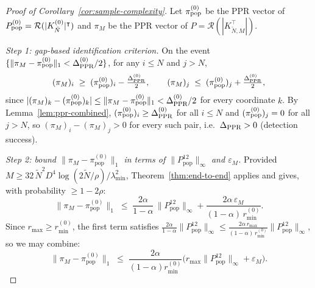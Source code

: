\documentclass{article}
\theoremstyle{plain}
\theoremstyle{definition}
\newcommand{\norm}[1]{\| #1 \|}
\def\tp{\intercal}
\begin{document}
\begin{proof}[Proof of Corollary~\ref{cor:sample-complexity}]
	Let $\pi_{\textnormal{pop}}^{(0)}$ be the PPR vector of $P^{(0)}_{\textnormal{pop}} = \mathcal{R}(|K^{(0)}_{\tilde{N}}|^\tp)$ and ${\pi}_M$ be the PPR vector of $P = \mathcal{R}(|K_{\tilde{N},M}^\tp|)$. 
	
	\emph{Step 1: gap-based identification criterion.} On the event $\{\norm{{\pi}_M - \pi_{\textnormal{pop}}^{(0)}}_1 < \Delta^{(0)}_{\textnormal{PPR}}/2\}$, for any $i \leq N$ and $j > N$,
		\begin{equation*}
			({\pi}_M)_i \;\geq\; (\pi_{\textnormal{pop}}^{(0)})_i - \tfrac{\Delta^{(0)}_{\textnormal{PPR}}}{2}, \qquad ({\pi}_M)_j \;\leq\;(\pi_{\textnormal{pop}}^{(0)})_j + \tfrac{\Delta^{(0)}_{\textnormal{PPR}}}{2},
		\end{equation*}
		since $|({\pi}_M)_k - (\pi_{\textnormal{pop}}^{(0)})_k| \leq \norm{{\pi}_M - \pi_{\textnormal{pop}}^{(0)}}_1 < \Delta^{(0)}_{\textnormal{PPR}}/2$ for every coordinate $k$. By Lemma~\ref{lem:ppr-combined}, $(\pi_{\textnormal{pop}}^{(0)})_i \geq \Delta^{(0)}_{\textnormal{PPR}}$ for all $i \leq N$ and $(\pi_{\textnormal{pop}}^{(0)})_j = 0$ for all $j > N$, so $({\pi}_M)_i - ({\pi}_M)_j > 0$ for every such pair, i.e.\ $\Delta_{\textnormal{PPR}} > 0$ (detection success).
	
	\emph{Step 2: bound $\norm{{\pi}_M - \pi_{\mathrm{pop}}^{(0)}}_1$ in terms of $\|P^{12}_{\mathrm{pop}}\|_\infty$ and $\varepsilon_M$.} Provided $M \geq 32\,\tilde{N}^2 D^4 \log(2\tilde{N}/\rho)/\lambda_{\min}^2$, Theorem~\ref{thm:end-to-end} applies and gives, with probability $\geq 1-2\rho$:
		\begin{equation}\label{eq:cor-sc-eps0}
			\norm{{\pi}_M - \pi_{\mathrm{pop}}^{(0)}}_1 \;\leq\; \frac{2\alpha}{1-\alpha}\,\|P^{12}_{\mathrm{pop}}\|_\infty + \frac{2\alpha\,\varepsilon_M}{(1-\alpha)\,r^{(0)}_{\min}}.
		\end{equation}
		Since $r_{\max} \geq r^{(0)}_{\min}$, the first term satisfies $\frac{2\alpha}{1-\alpha}\|P^{12}_{\mathrm{pop}}\|_\infty \leq \frac{2\alpha\,r_{\max}}{(1-\alpha)\,r^{(0)}_{\min}}\|P^{12}_{\mathrm{pop}}\|_\infty$, so we may combine:
	\begin{equation}\label{eq:cor-sc-total}
		\norm{{\pi}_M - \pi_{\mathrm{pop}}^{(0)}}_1 \;\leq\; \frac{2\alpha}{(1-\alpha)r^{(0)}_{\min}}\bigl(r_{\max}\|P^{12}_{\mathrm{pop}}\|_\infty + \varepsilon_M\bigr).
	\end{equation}
	

\end{proof}
\end{document}

